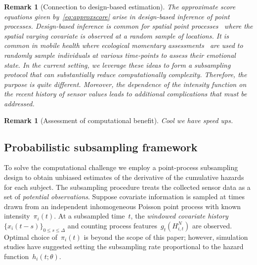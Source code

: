 \documentclass[12pt]{amsart}
\newtheorem{rmk}[thm]{Remark}%
\begin{document}
\begin{rmk}[Connection to design-based estimation]
The approximate score equations given by~\eqref{eq:approxscore} arise in design-based inference of point processes.  Design-based inference is common for spatial point processes~\citep{Waagepetersen2008} where the spatial varying covariate is observed at a random sample of locations. It is common in mobile health where ecological momentary assessments~\citep{Rathbun2012,Rathbun2016} are used to randomly sample individuals at various time-points to assess their emotional state.  In the current setting, we leverage these ideas to form a subsampling protocol that can substantially reduce computationally complexity.  Therefore, the purpose is quite different. Moreover, the dependence of the intensity function on the recent history of sensor values leads to additional complications that must be addressed.
\end{rmk}

\begin{rmk}[Assessment of computational benefit]
Cool we have speed ups.
\end{rmk}

\subsection{Probabilistic subsampling framework}

To solve the computational challenge we employ a point-process subsampling design to obtain unbiased estimates of the derivative of the cumulative hazards for each subject. The subsampling procedure treats the collected sensor data as a set of \emph{potential observations}. Suppose covariate information is sampled at times drawn from an independent inhomogeneous Poisson point process with known intensity~$\pi_i (t)$. At a subsampled time~$t$, the \emph{windowed covariate history} $\{ x_i (t-s)\}_{0 \leq s \leq \Delta}$ and counting process features~$g_t (H_{i,t}^N)$ are observed. Optimal choice of~$\pi_i (t)$ is beyond the scope of this paper; however, simulation studies have suggested setting the subsampling rate proportional to the hazard function~$h_i (t; \theta)$.
\end{document}
